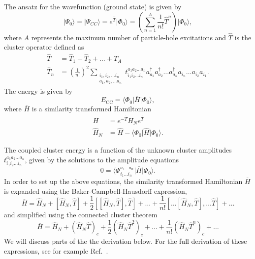   The ansatz for the wavefunction (ground state) is given by
  \begin{equation}
     \vert \Psi_0\rangle = \vert \Psi_{CC}\rangle = e^{\hat{T}} \vert
     \Phi_0\rangle = \left( \sum_{n=1}^{A} \frac{1}{n!} \hat{T}^n
     \right) \vert \Phi_0\rangle,
  \end{equation}
  where $A$ represents the maximum number of particle-hole excitations
  and $\hat{T}$ is the cluster operator defined as
  \begin{align}
              \hat{T} &= \hat{T}_1 + \hat{T}_2 + \ldots + \hat{T}_A
              \\ \hat{T}_n &= \left(\frac{1}{n!}\right)^2
              \sum_{\substack{ i_1,i_2,\ldots i_n \\ a_1,a_2,\ldots
                  a_n}} t_{i_1i_2\ldots i_n}^{a_1a_2\ldots a_n}
              a_{a_1}^\dagger a_{a_2}^\dagger \ldots a_{a_n}^\dagger
              a_{i_n} \ldots a_{i_2} a_{i_1}.
          \end{align}
      The energy is given by
      \begin{equation}
          E_{\mathrm{CC}} = \langle\Phi_0\vert \overline{H}\vert
          \Phi_0\rangle,
      \end{equation}
      where $\overline{H}$ is a similarity transformed Hamiltonian
      \begin{align}
          \overline{H}&= e^{-\hat{T}} \hat{H}_N e^{\hat{T}}
          \\ \hat{H}_N &= \hat{H} - \langle\Phi_0\vert \hat{H} \vert
          \Phi_0\rangle.
      \end{align}

      The coupled cluster energy is a function of the unknown cluster
      amplitudes $t_{i_1i_2\ldots i_n}^{a_1a_2\ldots a_n}$, given by
      the solutions to the amplitude equations
      \begin{equation}\label{eq:amplitudeeq}
          0 = \langle\Phi_{i_1 \ldots i_n}^{a_1 \ldots a_n}\vert
          \overline{H}\vert \Phi_0\rangle.
      \end{equation}
In order to set up the above equations, 
the similarity transformed Hamiltonian $\overline{H}$ is expanded
  using the Baker-Campbell-Hausdorff expression,
      \begin{equation}\label{eq:bch}
          \overline{H}= \hat{H}_N + \left[ \hat{H}_N, \hat{T} \right]
          + \frac{1}{2} \left[\left[ \hat{H}_N, \hat{T} \right],
            \hat{T}\right] + \ldots + \frac{1}{n!} \left[
            \ldots \left[ \hat{H}_N, \hat{T} \right], \ldots \hat{T}
            \right] +\dots
      \end{equation}
  and simplified using the connected cluster theorem
      \begin{equation}
          \overline{H}= \hat{H}_N + \left( \hat{H}_N \hat{T}\right)_c
          + \frac{1}{2} \left( \hat{H}_N \hat{T}^2\right)_c + \dots +
          \frac{1}{n!} \left( \hat{H}_N \hat{T}^n\right)_c +\dots
      \end{equation}
We will discuss parts of the the derivation below.
For the full derivation of these expressions, see for example Ref.~\cite{shavittbartlett2009}. 

